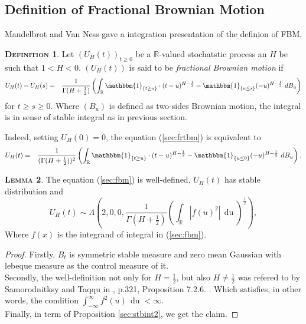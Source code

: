 \documentclass[a4paper, twoside, 11pt]{article}
\theoremstyle{definition}
\newtheorem{definition}{\scshape Definition}[section]
\newtheorem{lemma}[definition]{\scshape Lemma}
\newcommand{\brkt}[1]{\left({#1} \right)}
\begin{document}
\subsection{Definition of Fractional Brownian Motion}
Mandelbrot and Van Ness \cite{mandelbrot} gave a integration presentation of the definion of FBM.
\begin{definition}
  Let $(U_H(t))_{t\ge 0}$ be a $\mathbb{R}$-valued stochatstic process an $H$ be such that $1<H<0$. $(U_H(t))$ is said to be \emph{fractional Brownian motion} if 
  \begin{eqnarray}
	U_H(t) - U_H(s) &=& \frac{1}{\Gamma(H+\frac{1}{2})}\brkt{\int_{\mathbb{R}} \mathbbm{1}_{\{t\ge u\}}\cdot (t-u)^{H-\frac{1}{2}} - \mathbbm{1}_{\{u\le s\}} (-u)^{H-\frac{1}{2}} \, \mathop{dB_u}}
	\label{sec:frtbm}
  \end{eqnarray}
  for $t\ge s \ge 0$. Where $(B_u)$ is defined as two-sides Brownian motion, the integral is in sense of stable integral as in previous section.\end{definition}

Indeed, setting $U_H(0) = 0$, the equation (\ref{sec:frtbm}) is equivalent to
	 \begin{eqnarray}
	   U_H(t) &=& \frac{1}{(\Gamma(H+\frac{1}{2}))^2}\brkt{\int_{\mathbb{R}} \mathbbm{1}_{\{t\ge u\}}\cdot (t-u)^{H-\frac{1}{2}} - \mathbbm{1}_{\{u\le 0\}} (-u)^{H-\frac{1}{2}} \, \mathop{dB_u}}.
	\label{sec:fbm}
  \end{eqnarray}

\begin{lemma}
  The equation (\ref{sec:fbm}) is well-defined, $U_H(t)$ has stable distribution and 
  \begin{equation*}
	U_H(t) \sim \Lambda(2, 0, 0, \frac{1}{\Gamma(H+\frac{1}{2})}(\int_{\mathbb{R}} |f(u)^2|\, \mathop{du})^\frac{1}{2}),
  \end{equation*}
  Where $f(x)$ is the integrand of integral in (\ref{sec:fbm}).
  \label{sec:l2}
\end{lemma}
\begin{proof}
  Firstly, $B_t$ is symmetric stable measure and zero mean Gaussian with lebeque measure as the control measure of it. \\
  Secondly, the well-definition  not only for $H= \frac{1}{2}$, but also $H\neq \frac{1}{2}$ was refered to by Samorodnitksy and Taqqu in \cite{samorodnitsky}, p.321, Proposition 7.2.6. . Which satisfies, in other words, the condition $\int_{-\infty}^{\infty}f^2(u)\,\mathop{du} < \infty$.\\
  Finally, in term of Proposition \ref{sec:stbint2}, we get the claim.
\end{proof}
	
\end{document}
